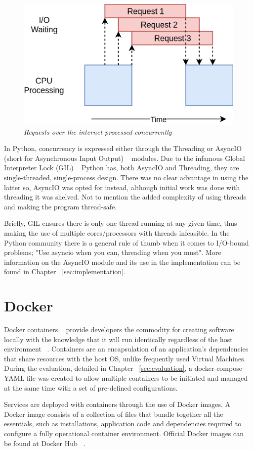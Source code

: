 \begin{figure}[ht]
 \centering
 \includegraphics[width=\linewidth]{figures/concurrency_example.png}
 \caption[Requests over the internet processed concurrently]{\textit{Requests over the internet processed concurrently} ~\cite{concurrency_realpython}}
 \label{fig:concurrency_example}
\end{figure}

In Python, concurrency is expressed either through the Threading or AsyncIO (short for Asynchronous Input Output) ~\cite{asyncio} modules. Due to the infamous Global Interpreter Lock (GIL) ~\cite{gil_realpython} Python has, both AsyncIO and Threading, they are single-threaded, single-process design. There was no clear advantage in using the latter so, AsyncIO was opted
for instead, although initial work was done with threading it was shelved. Not to mention the added complexity of using threads and making the program thread-safe. 

Briefly, GIL ensures there is only one thread running at any given time, thus making the use of multiple cores/processors with threads infeasible. In the Python community there is a general rule of thumb when it comes to I/O-bound problems; "Use asyncio when you can, threading when you must". More information on the AsyncIO module and its use in the \pname implementation can be found in Chapter ~\ref{sec:implementation}.

\section{Docker}
Docker containers ~\cite{docker_containers} provide developers the commodity for creating software locally with the knowledge that it will run identically regardless of the host environment ~\cite{using_docker_book}. Containers are an encapsulation of an application's dependencies that share resources with the host OS, unlike frequently used Virtual Machines. During the evaluation, detailed in Chapter ~\ref{sec:evaluation}, a docker-compose YAML file was created to allow multiple containers to be initiated and managed at the same time with a set of pre-defined configurations. 

Services are deployed with containers through the use of Docker images. A Docker image consists of a collection of files that bundle together all the essentials, such as installations, application code and dependencies required to configure a fully operational container environment. Official Docker images can be found at Docker Hub ~\cite{docker_hub}.